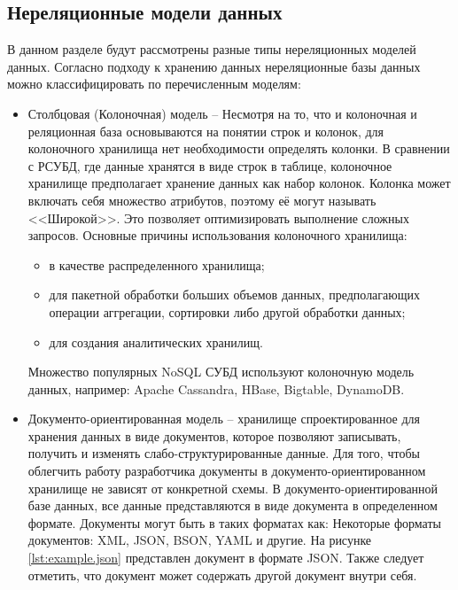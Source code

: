 \subsection{Нереляционные модели данных}
В данном разделе будут рассмотрены разные типы нереляционных моделей данных.
Согласно подходу к хранению данных нереляционные базы данных можно классифицировать по перечисленным моделям:
\begin{itemize}[label=---]
    \item Столбцовая (Колоночная) модель -- Несмотря на то, что и колоночная и реляционная база основываются на понятии строк и колонок,
    для колоночного хранилища нет необходимости определять колонки. %
    В сравнении с РСУБД, где данные хранятся в виде строк в таблице, колоночное хранилище предполагает хранение данных как набор колонок.
    Колонка может включать себя множество атрибутов, поэтому её могут называть <<Широкой>>.
    Это позволяет оптимизировать выполнение сложных запросов.
    Основные причины использования колоночного хранилища:
    \begin{itemize}[label=---]
        \item в качестве распределенного хранилища;
        \item для пакетной обработки больших объемов данных,
        предполагающих операции аггрегации,
        сортировки либо другой обработки данных;
        \item для создания аналитических хранилищ. 
    \end{itemize} 
    
    Множество популярных NoSQL СУБД используют колоночную модель данных, например: 
    Apache Cassandra, HBase, Bigtable, DynamoDB.

    \item Документо-ориентированная модель -- хранилище спроектированное для хранения данных в виде документов,
    которое позволяют записывать, получить и изменять слабо-структурированные данные.
    Для того, чтобы облегчить работу разработчика документы в документо-ориентированном хранилище не зависят от конкретной схемы.
    В документо-ориентированной базе данных, все данные представляются в виде документа в определенном формате.
    Документы могут быть в таких форматах как: 
    Некоторые форматы документов: XML, JSON, BSON, YAML и другие.
    На рисунке \ref{lst:example.json} представлен документ в формате JSON.
    Также следует отметить, что документ может содержать другой документ внутри себя.

    \clearpage


\end{itemize}
